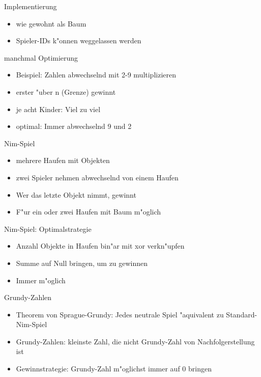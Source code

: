 \documentclass[18pt]{beamer}
\begin{document}
\begin{frame}{Implementierung}
\begin{itemize}
\item wie gewohnt als Baum

\pause
\item Spieler-IDs k"onnen weggelassen werden

\end{itemize}
\end{frame}

\begin{frame}{manchmal Optimierung}
\begin{itemize}
\item Beispiel: Zahlen abwechselnd mit 2-9 multiplizieren
\pause
\item erster "uber n (Grenze) gewinnt
\pause
\item je acht Kinder: Viel zu viel
\pause
\item optimal: Immer abwechselnd 9 und 2
\end{itemize}
\end{frame}

\begin{frame}{Nim-Spiel}
\begin{itemize}
\item mehrere Haufen mit Objekten
\pause
\item zwei Spieler nehmen abwechselnd von einem Haufen
\pause
\item Wer das letzte Objekt nimmt, gewinnt
\pause
\item F"ur ein oder zwei Haufen mit Baum m"oglich 
\end{itemize}
\end{frame}

\begin{frame}{Nim-Spiel: Optimalstrategie}
\begin{itemize}
\item Anzahl Objekte in Haufen bin"ar mit xor verkn"upfen
\pause
\item Summe auf Null bringen, um zu gewinnen
\pause
\item Immer m"oglich
\end{itemize}
\end{frame}

\begin{frame}{Grundy-Zahlen}
\begin{itemize}
\item Theorem von Sprague-Grundy: Jedes neutrale Spiel "aquivalent zu Standard-Nim-Spiel
\pause
\item Grundy-Zahlen: kleinste Zahl, die nicht Grundy-Zahl von Nachfolgerstellung ist
\pause
\item Gewinnstrategie: Grundy-Zahl m"oglichst immer auf 0 bringen
\end{itemize}
\end{frame}
\end{document}
